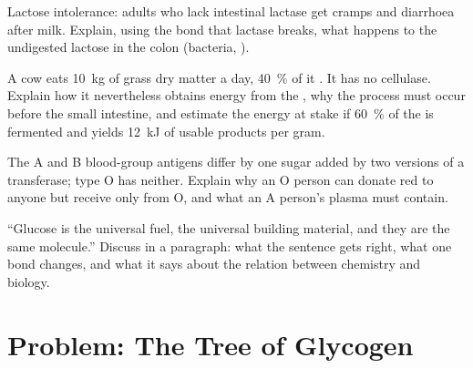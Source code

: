 \begin{exercise}[$\star\star$]\label{exo:b1:carbohydrates:9}
Lactose intolerance: adults who lack intestinal lactase get cramps and
diarrhoea after milk. Explain, using the bond that lactase breaks, what
happens to the undigested lactose in the colon (bacteria, ).
\end{exercise}

\begin{exercise}[$\star\star\star$]\label{exo:b1:carbohydrates:10}
A cow eats \qty{10}{kg} of grass dry matter a day, \qty{40}{\%} of it
. It has no cellulase. Explain how it nevertheless obtains
energy from the , why the process must occur before the small
intestine, and estimate the energy at stake if \qty{60}{\%} of the
 is fermented and yields \qty{12}{kJ} of usable products per
gram.
\end{exercise}

\begin{exercise}[$\star\star\star$]\label{exo:b1:carbohydrates:11}
The A and B blood-group antigens differ by one sugar added by two
versions of a transferase; type O has neither. Explain why an O person
can donate red  to anyone but receive only from O, and what an
A person's plasma must contain.
\end{exercise}

\begin{exercise}[$\star\star\star$]\label{exo:b1:carbohydrates:12}
``Glucose is the universal fuel,  the universal building
material, and they are the same molecule.'' Discuss in a paragraph:
what the sentence gets right, what one bond changes, and what it says
about the relation between chemistry and biology.
\end{exercise}

\section{Problem: The Tree of Glycogen}

